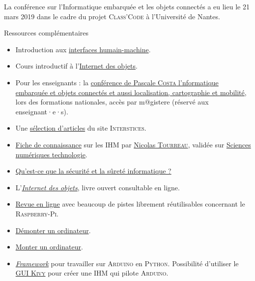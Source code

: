 La conférence sur l'Informatique embarquée et les objets connectés a eu lieu le 21 mars 2019 dans le cadre du projet \textsc{Class'Code} à l’Université de Nantes.

\begin{gofurther}{Ressources complémentaires}
\begin{itemize}\jazzitem
\item Introduction aux \href{https://pixees.fr/interfacer-la-machine-a-lhumain-2/}{interfaces humain-machine}.
\item Cours introductif à l'\href{http://www.lirmm.fr/~seriai/uploads/Enseignement/iot.pdf}{Internet des objets}.
\item Pour les enseignants : la \href{https://magistere.education.fr/dgesco/}{conférence de Pascale \textsc{Costa} l'nformatique embarquée et objets connectés et aussi localisation, cartographie et mobilité}, lors des formations nationales, accès par m@gistere (réservé aux enseignant·e·s).
\item Une \href{https://interstices.info/dossier/snt-informatique-embarquee-et-objets-connectes/}{sélection d'articles} du site \textsc{Interstices}.
\end{itemize}

\vspace{2pt}
\begin{itemize}\jazzitem
\item \href{./Documents/Chapter08/cardVIII-18-snt-iot-ihm-nicolas-tourreau.odt}{Fiche de connaissance} sur les IHM par \href{mailto://ntourreau@ac-toulouse.fr}{Nicolas \textsc{Tourreau}}, validée sur \href{mailto://sciences-numeriques-technologie@groupes.renater.fr}{Sciences numériques technologie}.
\item \href{https://pixees.fr/quest-ce-que-la-securite-et-la-surete-informatique/}{Qu’est-ce que la sécurité et la sûreté informatique ?}
\item L'\href{https://books.openedition.org/editionsmsh/78}{\textit{Internet des objets}}, livre ouvert consultable en ligne.
\item \href{https://www.framboise314.fr/publications-revues-magazines-livres-e-books-et-articles-sur-le-raspberry-pi/the-magpi/}{Revue en ligne} avec beaucoup de pistes librement réutilisables concernant le \textsc{Raspberry-Pi}.
\item \href{https://pixees.fr/demonter-un-ordinateur/}{Démonter un ordinateur}.
\item \href{https://pixees.fr/monter-un-ordinateur/}{Monter un ordinateur}.
\item \href{https://www.f-legrand.fr/scidoc/docimg/sciphys/arduino/python/python.html}{\textit{Framework}} pour travailler sur \textsc{Arduino} en \textsc{Python}. Possibilité d'utiliser le \href{http://tableauxmaths.fr/spip/spip.php?article149}{\textsc{GUI Kivy}} pour créer une IHM qui pilote \textsc{Arduino}.
\end{itemize}
\end{gofurther}


